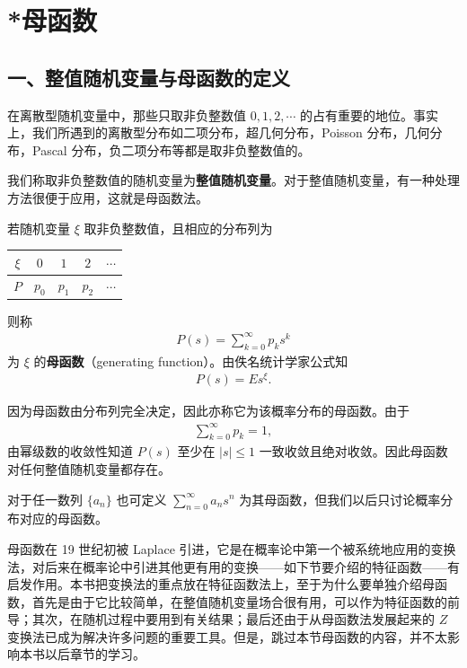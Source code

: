 \documentclass[../../main.tex]{subfiles}
\begin{document}
\section{*母函数}\label{section:ch04-母函数}

\subsection*{一、整值随机变量与母函数的定义}

在离散型随机变量中，那些只取非负整数值 $0,1,2,\cdots$ 的占有重要的地位。事实上，我们所遇到的离散型分布如二项分布，超几何分布，Poisson 分布，几何分布，Pascal 分布，负二项分布等都是取非负整数值的。

我们称取非负整数值的随机变量为\textbf{整值随机变量}。对于整值随机变量，有一种处理方法很便于应用，这就是母函数法。

若随机变量 $\xi$ 取非负整数值，且相应的分布列为
\begin{center}
\begin{tabular}{c|cccc}
$\xi$ & $0$ & $1$ & $2$ & $\cdots$\\
\hline
$P$ & $p_0$ & $p_1$ & $p_2$ & $\cdots$
\end{tabular}
\end{center}
则称
\begin{align}
P(s)=\sum_{k=0}^{\infty}p_k s^k\label{align:ch04-母函数定义}
\end{align}
为 $\xi$ 的\textbf{母函数}（generating function）。由佚名统计学家公式知
\begin{align}
P(s)=E s^{\xi}.\label{align:ch04-母函数期望形式}
\end{align}

因为母函数由分布列完全决定，因此亦称它为该概率分布的母函数。由于
\begin{align}
\sum_{k=0}^{\infty}p_k=1,\label{align:ch04-概率和为1}
\end{align}
由幂级数的收敛性知道 $P(s)$ 至少在 $|s|\leqslant 1$ 一致收敛且绝对收敛。因此母函数对任何整值随机变量都存在。

对于任一数列 $\{a_n\}$ 也可定义 $\sum_{n=0}^{\infty}a_n s^n$ 为其母函数，但我们以后只讨论概率分布对应的母函数。

母函数在 19 世纪初被 Laplace 引进，它是在概率论中第一个被系统地应用的变换法，对后来在概率论中引进其他更有用的变换——如下节要介绍的特征函数——有启发作用。本书把变换法的重点放在特征函数法上，至于为什么要单独介绍母函数，首先是由于它比较简单，在整值随机变量场合很有用，可以作为特征函数的前导；其次，在随机过程中要用到有关结果；最后还由于从母函数法发展起来的 $Z$ 变换法已成为解决许多问题的重要工具。但是，跳过本节母函数的内容，并不太影响本书以后章节的学习。
\end{document}
